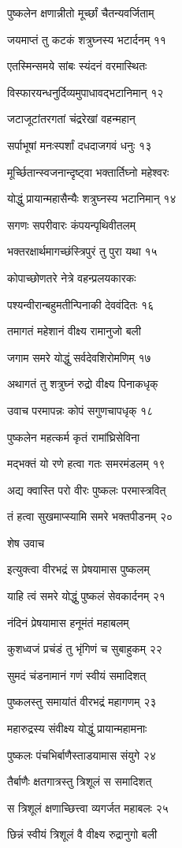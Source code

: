 पुष्कलेन क्षणान्नीतो मूर्च्छां चैतन्यवर्जिताम्

जयमाप्तं तु कटकं शत्रुघ्नस्य भटार्दनम् ११

एतस्मिन्समये सांबः स्यंदनं वरमास्थितः

विस्फारयन्धनुर्दिव्यमुपाधावद्भटानिमान् १२

जटाजूटांतरगतां चंद्ररेखां वहन्महान्

सर्पाभूषां मनःस्पर्शां दधदाजगवं धनुः १३

मूर्च्छितान्स्वजनान्दृष्ट्वा भक्तार्तिघ्नो महेश्वरः

योद्धुं प्रायान्महासैन्यैः शत्रुघ्नस्य भटानिमान् १४

सगणः सपरीवारः कंपयन्पृथिवीतलम्

भक्तरक्षार्थमागच्छंस्त्रिपुरं तु पुरा यथा १५

कोपाच्छोणतरे नेत्रे वहन्प्रलयकारकः

पश्यन्वीरान्बहुमतीन्पिनाकी देववंदितः १६

तमागतं महेशानं वीक्ष्य रामानुजो बली

जगाम समरे योद्धुं सर्वदेवशिरोमणिम् १७

अथागतं तु शत्रुघ्नं रुद्रो वीक्ष्य पिनाकधृक्

उवाच परमापन्नः कोपं सगुणचापधृक् १८

पुष्कलेन महत्कर्म कृतं रामांघ्रिसेविना

मद्भक्तं यो रणे हत्वा गतः समरमंडलम् १९

अद्य क्वास्ति परो वीरः पुष्कलः परमास्त्रवित्

तं हत्वा सुखमाप्स्यामि समरे भक्तपीडनम् २०

शेष उवाच

इत्युक्त्वा वीरभद्रं स प्रेषयामास पुष्कलम्

याहि त्वं समरे योद्धुं पुष्कलं सेवकार्दनम् २१

नंदिनं प्रेषयामास हनूमंतं महाबलम्

कुशध्वजं प्रचंडं तु भृंगिणं च सुबाहुकम् २२

सुमदं चंडनामानं गणं स्वीयं समादिशत्

पुष्कलस्तु समायांतं वीरभद्रं महागणम् २३

महारुद्रस्य संवीक्ष्य योद्धुं प्रायान्महामनाः

पुष्कलः पंचभिर्बाणैस्ताडयामास संयुगे २४

तैर्बाणैः क्षतगात्रस्तु त्रिशूलं स समादिशत्

स त्रिशूलं क्षणाच्छित्त्वा व्यगर्जत महाबलः २५

छिन्नं स्वीयं त्रिशूलं वै वीक्ष्य रुद्रानुगो बली


